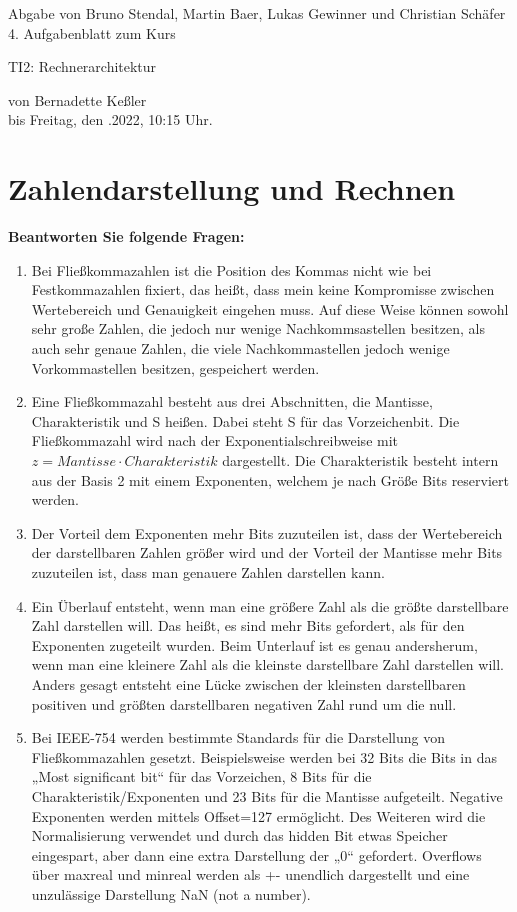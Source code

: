 \documentclass[11pt]{article}
\newcommand{\VORLESUNG}{TI2: Rechnerarchitektur}
\newcommand{\STUDENTS}{Bruno Stendal, Martin Baer, Lukas Gewinner und Christian Schäfer}
\newcommand{\STAFF}{Bernadette Keßler}
\newcommand{\ASSIGNMENT}{4}
\newcommand{\DELIVER}{Freitag, den .2022, 10:15 Uhr}
\newcommand{\aufgabe}[1]{\item{\bf #1}}
\begin{document}
\ofoot{\pagemark}
\begin{center}
    Abgabe von \STUDENTS{}\\
 \ASSIGNMENT{}. Aufgabenblatt  zum Kurs 
\vspace*{0.2cm}

{\Large \VORLESUNG{}}

{\small von \STAFF{} \\ bis \DELIVER{}.}
\vspace*{0.5cm}\\
\end{center}
\section{Zahlendarstellung und Rechnen}
\aufgabe{Beantworten Sie folgende Fragen:}
\begin{enumerate}
    \item Bei Fließkommazahlen ist die Position des Kommas nicht wie bei Festkommazahlen fixiert, das heißt, dass mein keine Kompromisse zwischen Wertebereich und Genauigkeit eingehen muss. Auf diese Weise können sowohl sehr große Zahlen, die jedoch nur wenige Nachkommsastellen besitzen, als auch sehr genaue Zahlen, die viele Nachkommastellen jedoch wenige Vorkommastellen besitzen, gespeichert werden.
    \item Eine Fließkommazahl besteht aus drei Abschnitten, die Mantisse, Charakteristik und S heißen. Dabei steht S für das Vorzeichenbit. Die Fließkommazahl wird nach der Exponentialschreibweise mit $z = Mantisse \cdot Charakteristik$ dargestellt. Die Charakteristik besteht intern aus der Basis 2 mit einem Exponenten, welchem je nach Größe Bits reserviert werden.
    \item Der Vorteil dem Exponenten mehr Bits zuzuteilen ist, dass der Wertebereich der darstellbaren Zahlen größer wird und der Vorteil der Mantisse mehr Bits zuzuteilen ist, dass man genauere Zahlen darstellen kann.
    \item Ein Überlauf entsteht, wenn man eine größere Zahl als die größte darstellbare Zahl darstellen will. Das heißt, es sind mehr Bits gefordert, als für den Exponenten zugeteilt wurden. Beim Unterlauf ist es genau andersherum, wenn man eine kleinere Zahl als die kleinste darstellbare Zahl darstellen will. Anders gesagt entsteht eine Lücke zwischen der kleinsten darstellbaren positiven und größten darstellbaren negativen Zahl rund um die null.
    \item Bei IEEE-754 werden bestimmte Standards für die Darstellung von Fließkommazahlen gesetzt. Beispielsweise werden bei 32 Bits die Bits in das „Most significant bit“ für das Vorzeichen, 8 Bits für die Charakteristik/Exponenten und 23 Bits für die Mantisse aufgeteilt. Negative Exponenten werden mittels Offset=127 ermöglicht. Des Weiteren wird die Normalisierung verwendet und durch das hidden Bit etwas Speicher eingespart, aber dann eine extra Darstellung der „0“ gefordert. Overflows über maxreal und minreal werden als +- unendlich dargestellt und eine unzulässige Darstellung NaN (not a number).

\end{enumerate}
\end{document}

